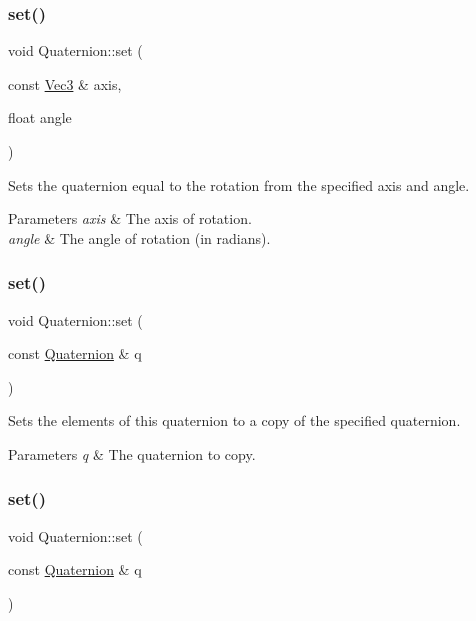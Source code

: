 \subsubsection{\texorpdfstring{set()}{set()}\hspace{0.1cm}{\footnotesize\ttfamily [8/10]}}
{\footnotesize\ttfamily void Quaternion\+::set (\begin{DoxyParamCaption}\item[{const \hyperlink{classVec3}{Vec3} \&}]{axis,  }\item[{float}]{angle }\end{DoxyParamCaption})}

Sets the quaternion equal to the rotation from the specified axis and angle.


\begin{DoxyParams}{Parameters}
{\em axis} & The axis of rotation. \\
\hline
{\em angle} & The angle of rotation (in radians). \\
\hline
\end{DoxyParams}
\mbox{\label{classQuaternion_aebd9c51e5ff6f3d0cc09e61350d33dd3}} 
\subsubsection{\texorpdfstring{set()}{set()}\hspace{0.1cm}{\footnotesize\ttfamily [9/10]}}
{\footnotesize\ttfamily void Quaternion\+::set (\begin{DoxyParamCaption}\item[{const \hyperlink{classQuaternion}{Quaternion} \&}]{q }\end{DoxyParamCaption})}

Sets the elements of this quaternion to a copy of the specified quaternion.


\begin{DoxyParams}{Parameters}
{\em q} & The quaternion to copy. \\
\hline
\end{DoxyParams}
\mbox{\label{classQuaternion_aebd9c51e5ff6f3d0cc09e61350d33dd3}} 
\subsubsection{\texorpdfstring{set()}{set()}\hspace{0.1cm}{\footnotesize\ttfamily [10/10]}}
{\footnotesize\ttfamily void Quaternion\+::set (\begin{DoxyParamCaption}\item[{const \hyperlink{classQuaternion}{Quaternion} \&}]{q }\end{DoxyParamCaption})}

